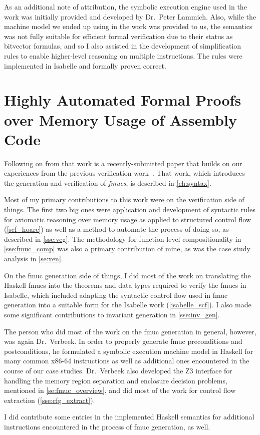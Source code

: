 As an additional note of attribution, the symbolic execution engine
used in the work was initially provided and developed by Dr.~Peter Lammich.
Also, while the machine model we ended up using in the work was provided to us,
the semantics was not fully suitable for efficient formal verification
due to their status as bitvector formulas,
and so I also assisted in the development of simplification rules
to enable higher-level reasoning on multiple instructions.
The rules were implemented in Isabelle and formally proven correct.

\section*{Highly Automated Formal Proofs over Memory Usage of Assembly Code}
\label{attribute2}
Following on from that work is a recently-submitted paper
that builds on our experiences from the previous verification
work~\citep{popl2019underreview}. That work,
which introduces the generation and verification of
\emph{\acp{fmuc}}, is described in \cref{ch:syntax}.

Most of my primary contributions to this work were on the verification side of things.
The first two big ones were application and development of syntactic rules
for axiomatic reasoning over memory usage
as applied to structured control flow (\cref{scf_hoare})
as well as a method to automate the process of doing so, 
as described in \cref{sse:vcg}.
The methodology for function-level compositionality in \cref{sse:fmuc_comp}
was also a primary contribution of mine,
as was the case study analysis in \cref{se:xen}.

On the \ac{fmuc} generation side of things,
I did most of the work on translating the Haskell \acp{fmuc}
into the theorems and data types required to verify the \acp{fmuc} in Isabelle,
which included adapting the syntactic control flow used in \ac{fmuc} generation
into a suitable form for the Isabelle work (\cref{isabelle_scf}).
I also made some significant contributions to invariant generation in \cref{sse:inv_gen}.

The person who did most of the work on the \ac{fmuc} generation in general,
however, was again Dr.~Verbeek.
In order to properly generate \ac{fmuc} preconditions and postconditions,
he formulated a symbolic execution machine model in Haskell
for many common x86-64 instructions
as well as additional ones encountered in the course of our case studies.
Dr.~Verbeek also developed the Z3 interface
for handling the memory region separation and enclosure decision problems,
mentioned in \cref{se:fmuc_overview},
and did most of the work for control flow extraction (\cref{sse:cfg_extract}).

I did contribute some entries in the implemented Haskell semantics
for additional instructions encountered in the process of \ac{fmuc} generation,
as well.
